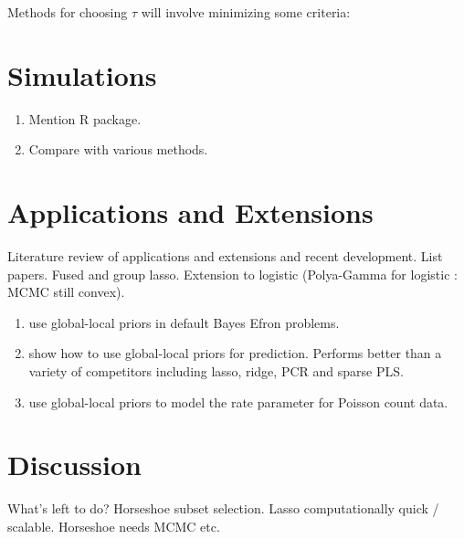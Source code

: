 \documentclass[11pt]{article}
\numberwithin{equation}{section}
\begin{document}
Methods for choosing $\tau$ will involve minimizing some criteria: %

\section{Simulations}
\begin{enumerate}
\item Mention R package. 

\item Compare with various methods.
\end{enumerate}

\section{Applications and Extensions}

Literature review of applications and extensions and recent development. List papers. 
Fused and group lasso. Extension to logistic (Polya-Gamma for logistic : MCMC still convex). 

\begin{enumerate}
\item \citet{bhadra2015default} use global-local priors in default Bayes Efron problems.

\item \citet{bhadra2016prediction} show how to use global-local priors for prediction. Performs better than a variety of competitors including lasso, ridge, PCR and sparse PLS.

\item \citet{datta2015inference} use global-local priors to model the rate parameter for Poisson count data.

\end{enumerate}


\section{Discussion}

What's left to do? Horseshoe subset selection. Lasso computationally quick / scalable. Horseshoe needs MCMC etc. 
\end{document}
